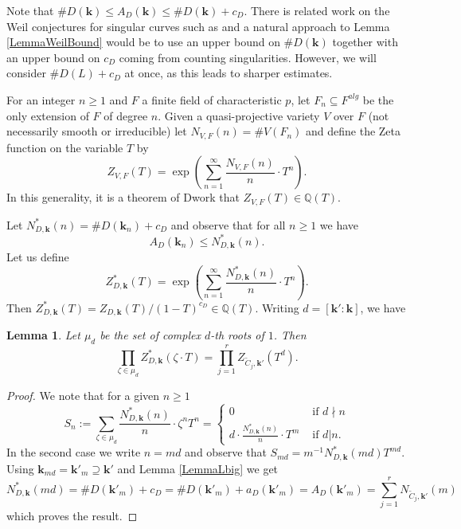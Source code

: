 \documentclass[11pt]{amsart}
\newtheorem{lemma}[theorem]{Lemma}
\theoremstyle{remark}
\numberwithin{equation}{section}
\newcommand{\Q}{\mathbb{Q}}
\newcommand{\kk}{\mathbf{k}}
\begin{document}
Note that $\#D(\kk)\le A_D(\kk) \le \# D(\kk) + c_D$. There is related work on the Weil conjectures for singular curves such as \cite{AubryPerret} and a natural approach to Lemma \ref{LemmaWeilBound} would be to use an upper bound on $\#D(\kk)$ together with an upper bound on $c_D$ coming from counting singularities. However, we will consider $\#D(L)+c_D$ at once, as this leads to sharper estimates.


For an integer $n\ge 1$ and $F$ a finite field of characteristic $p$, let $F_n\subseteq F^{alg}$ be the only extension of $F$ of degree $n$. Given a quasi-projective variety $V$ over $F$ (not necessarily smooth or irreducible) let $N_{V,F}(n)=\# V(F_n)$ and define the Zeta function on the variable $T$ by
$$
Z_{V,F}(T)=\exp\left(\sum_{n=1}^\infty \frac{N_{V,F}(n)}{n}\cdot T^n\right).
$$
In this generality, it is a theorem of Dwork \cite{Dwork} that $Z_{V,F}(T)\in \Q(T)$.

Let $N^*_{D,\kk}(n)=\# D(\kk_n)+c_D$ and observe that for all $n\ge 1$ we have 
\begin{equation}\label{EqnBdAD}
A_D(\kk_n)\le N^*_{D,\kk}(n). 
\end{equation}
Let us define
$$
Z^*_{D,\kk}(T)=\exp\left(\sum_{n=1}^\infty \frac{N^*_{D,\kk}(n)}{n}\cdot T^n\right).
$$
Then $Z^*_{D,\kk}(T)=Z_{D,\kk}(T)/(1-T)^{c_D}\in \Q(T)$. Writing $d=[\kk':\kk]$, we have
\begin{lemma}\label{LemmaZprod} Let $\mu_d$ be the set of complex $d$-th roots of $1$. Then
$$
\prod_{\zeta\in \mu_d} Z^*_{D,\kk}(\zeta\cdot T) = \prod_{j=1}^r Z_{\widetilde{C}_j,\kk'}(T^d).
$$
\end{lemma}
\begin{proof} We note that for a given $n\ge 1$
$$
S_n:=\sum_{\zeta\in \mu_d}\frac{N^*_{D,\kk}(n)}{n}\cdot \zeta^nT^n=
\begin{cases}
0 & \mbox{ if } d\nmid n\\
d\cdot \frac{N^*_{D,\kk}(n)}{n}\cdot T^m & \mbox{ if } d|n.
\end{cases}
$$
In the second case we write $n=md$ and observe that $S_{md} = m^{-1}N^*_{D,\kk}(md) T^{md}$. Using $\kk_{md}=\kk'_m\supseteq \kk'$ and Lemma \ref{LemmaLbig} we get
$$
N^*_{D,\kk}(md) =\# D(\kk'_m) + c_D=\# D(\kk'_m)+ a_D(\kk'_m)=A_D(\kk'_m)=\sum_{j=1}^r N_{\widetilde{C}_j,\kk'}(m)
$$
which proves the result.
\end{proof}
\end{document}

